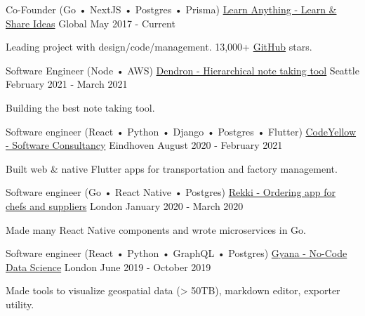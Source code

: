 

\begin{cventries}

  \cventry
    {Co-Founder (Go • NextJS • Postgres • Prisma)}
    {\href{https://learn-anything.xyz}{Learn Anything - Learn \& Share Ideas}}
    {Global}
    {May 2017 - Current}
     {
      \begin{cvitems}
        \item {Leading project with design/code/management. 13,000+ \href{https://github.com/learn-anything/learn-anything}{GitHub} stars.}
      \end{cvitems}
    }

  \cventry
    {Software Engineer (Node • AWS)}
    {\href{https://dendron.so}{Dendron - Hierarchical note taking tool}}
    {Seattle}
    {February 2021 - March 2021}
     {
      \begin{cvitems}
        \item {Building the best note taking tool.}
      \end{cvitems}
    }

  \cventry
    {Software engineer (React • Python • Django • Postgres • Flutter)}
    {\href{https://codeyellow.nl}{CodeYellow - Software Consultancy}}
    {Eindhoven}
    {August 2020 - February 2021}
     {
      \begin{cvitems}
        \item {Built web \& native Flutter apps for transportation and factory management.}
      \end{cvitems}
    }

  \cventry
    {Software engineer (Go • React Native • Postgres)}
    {\href{https://www.rekki.com}{Rekki - Ordering app for chefs and suppliers}}
    {London}
    {January 2020 - March 2020}
     {
      \begin{cvitems}
        \item {Made many React Native components and wrote microservices in Go.}
      \end{cvitems}
    }

  \cventry
    {Software engineer (React • Python • GraphQL • Postgres)}
    {\href{https://www.gyana.com}{Gyana - No-Code Data Science}}
    {London}
    {June 2019 - October 2019}
     {
      \begin{cvitems}
        \item {Made tools to visualize geospatial data (> 50TB), markdown editor, exporter utility.}
      \end{cvitems}
    }


\end{cventries}
